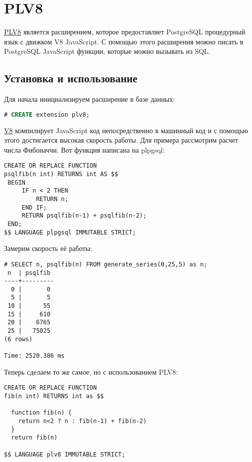 \section{PLV8}

\href{https://github.com/plv8/plv8}{PLV8} является расширением, которое предоставляет PostgreSQL процедурный язык с движком V8 JavaScript. С помощью этого расширения можно писать в PostgreSQL JavaScript функции, которые можно вызывать из SQL.

\subsection{Установка и использование}

Для начала инициализируем расширение в базе данных:

\begin{lstlisting}[language=SQL,label=lst:plv8jsinit,caption=Инициализация plv8]
# CREATE extension plv8;
\end{lstlisting}

\href{http://en.wikipedia.org/wiki/V8\_(JavaScript\_engine)}{V8} компилирует JavaScript код непосредственно в машинный код и с помощью этого достигается высокая скорость работы. Для примера рассмотрим расчет числа Фибоначчи. Вот функция написана на plpgsql:

\begin{lstlisting}[label=lst:plv8js1,caption=Фибоначчи на plpgsql]
CREATE OR REPLACE FUNCTION
psqlfib(n int) RETURNS int AS $$
 BEGIN
     IF n < 2 THEN
         RETURN n;
     END IF;
     RETURN psqlfib(n-1) + psqlfib(n-2);
 END;
$$ LANGUAGE plpgsql IMMUTABLE STRICT;
\end{lstlisting}

Замерим скорость её работы:

\begin{lstlisting}[label=lst:plv8js2,caption=Скорость расчета числа Фибоначчи на plpgsql]
# SELECT n, psqlfib(n) FROM generate_series(0,25,5) as n;
 n  | psqlfib
----+---------
  0 |       0
  5 |       5
 10 |      55
 15 |     610
 20 |    6765
 25 |   75025
(6 rows)

Time: 2520.386 ms
\end{lstlisting}

Теперь сделаем то же самое, но с использованием PLV8:

\begin{lstlisting}[label=lst:plv8js3,caption=Фибоначчи на plv8]
CREATE OR REPLACE FUNCTION
fib(n int) RETURNS int as $$

  function fib(n) {
    return n<2 ? n : fib(n-1) + fib(n-2)
  }
  return fib(n)

$$ LANGUAGE plv8 IMMUTABLE STRICT;
\end{lstlisting}

